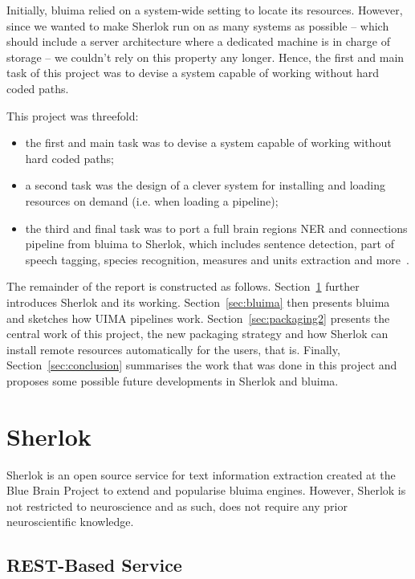 \documentclass{article}
\begin{document}
Initially, bluima relied on a system-wide setting to locate its resources. However, since we wanted
to make Sherlok run on as many systems as possible -- which should include a server architecture
where a dedicated machine is in charge of storage -- we couldn't rely on this property any longer.
Hence, the first and main task of this project was to devise a system capable of working without
hard coded paths.

This project was threefold:

\begin{itemize}[label=]
    \item the first and main task was to devise a system capable of working without hard coded
        paths;
    \item a second task was the design of a clever system for installing and loading resources on
        demand (i.e. when loading a pipeline);
    \item the third and final task was to port a full brain regions NER and connections pipeline
        from bluima to Sherlok, which includes sentence detection, part of speech tagging, species
        recognition, measures and units extraction and more~\cite{bluima_2013}.
\end{itemize}

The remainder of the report is constructed as follows. Section~\ref{sec:sherlok} further introduces
Sherlok and its working. Section~\ref{sec:bluima} then presents bluima and sketches how UIMA
pipelines work. Section~\ref{sec:packaging2} presents the central work of this project, the new
packaging strategy and how Sherlok can install remote resources automatically for the users, that
is.  Finally, Section~\ref{sec:conclusion} summarises the work that was done in this project and
proposes some possible future developments in Sherlok and bluima.

\section{Sherlok}
\label{sec:sherlok}

Sherlok is an open source service for text information extraction created at the Blue Brain Project
to extend and popularise bluima engines. However, Sherlok is not restricted to neuroscience and as
such, does not require any prior neuroscientific knowledge.

\subsection{REST-Based Service}
\end{document}

